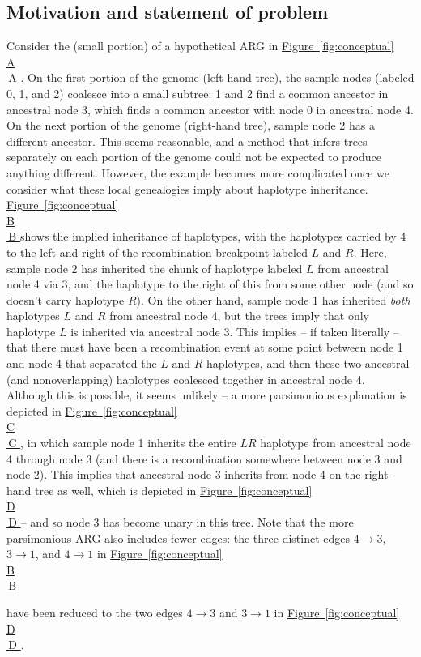 \documentclass[10pt,twoside,lineno]{gsajnl}
\newcommand*{\figref}[2][]{%
	\hyperref[{#2}]{%
		Figure~\ref*{#2}%
		\ifx\\#1\\%
		\else
		\,#1%
		\fi
	}%
}
\begin{document}
\subsection{Motivation and statement of problem}


Consider the (small portion) of a hypothetical ARG in \figref[A]{fig:conceptual}.
On the first portion of the genome (left-hand tree), the sample nodes (labeled 0, 1, and 2)
coalesce into a small subtree: 1 and 2 find a common ancestor in ancestral node 3,
which finds a common ancestor with node 0 in ancestral node 4.
On the next portion of the genome (right-hand tree), sample node 2 has a different ancestor.
This seems reasonable, and a method that infers trees separately on each portion of the genome
could not be expected to produce anything different.
However, the example becomes more complicated once we consider what these local genealogies imply about haplotype inheritance.
\figref[B]{fig:conceptual} shows the implied inheritance of haplotypes,
with the haplotypes carried by 4 to the left and right of the recombination breakpoint labeled $L$ and $R$.
Here, sample node 2 has inherited the chunk of haplotype labeled $L$ from ancestral node 4 via 3,
and the haplotype to the right of this from some other node (and so doesn't carry haplotype $R$).
On the other hand, sample node 1 has inherited \emph{both} haplotypes $L$ and $R$
from ancestral node 4, but the trees imply that only haplotype $L$ is inherited via ancestral node 3.
This implies -- if taken literally -- that there must have been a recombination event
at some point between node 1 and node 4 that separated the $L$ and $R$ haplotypes,
and then these two ancestral (and nonoverlapping) haplotypes coalesced together in ancestral node 4.
Although this is possible, it seems unlikely --
a more parsimonious explanation is depicted in \figref[C]{fig:conceptual},
in which sample node 1 inherits the entire $LR$ haplotype from ancestral node 4 through node 3
(and there is a recombination somewhere between node 3 and node 2).
This implies that ancestral node 3 inherits from node 4 on the right-hand tree as well,
which is depicted in \figref[D]{fig:conceptual} --
and so node 3 has become unary in this tree.
Note that the more parsimonious ARG also includes fewer edges:
the three distinct edges $4 \to 3$, $3 \to 1$, and $4 \to 1$ in \figref[B]{fig:conceptual}
have been reduced to the two edges
$4 \to 3$ and $3 \to 1$ in \figref[D]{fig:conceptual}.
\end{document}
